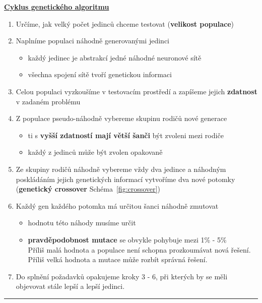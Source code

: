 \documentclass[a4paper,12pt]{article}
\begin{document}
        \underline{\textbf{\large{Cyklus genetického algoritmu}}}
        \begin{enumerate}[itemsep=-1.5mm]
            \item Určíme, jak velký počet jedinců chceme testovat (\textbf{velikost populace})
            \item Naplníme populaci náhodně generovanými jedinci
            \begin{itemize}[noitemsep]
                \item každý jedinec je abstrakcí jedné náhodné neuronové sítě
                \item všechna spojení sítě tvoří genetickou informaci
            \end{itemize}
            \item Celou populaci vyzkoušíme v testovacím prostředí a zapíšeme jejich \textbf{zdatnost} 
                v zadaném problému
            \item Z populace pseudo-náhodně vybereme skupinu rodičů nové generace 
            \begin{itemize}[noitemsep]
                \item ti s \textbf{vyšší zdatností mají větší šanči} být zvoleni mezi rodiče
                \item každý z jedinců může být zvolen opakovaně
            \end{itemize}
            \item Ze skupiny rodičů náhodně vybereme vždy dva jedince a náhodným poskládáním jejich
                genetických informací vytvoříme dva nové potomky (\textbf{genetický crossover} Schéma~\ref{fig:crossover})
            \item Každý gen každého potomka má určitou šanci náhodně zmutovat
            \begin{itemize}[noitemsep]
                \item hodnotu této náhody musíme určit
                \item \textbf{pravděpodobnost mutace} se obvykle pohybuje mezi 1\% - 5\%\\
                    Příliš malá hodnota a populace není schopna prozkoumávat nová řešení.
                    Příliš velká hodnota a mutace může rozbít správná řešení.

            \end{itemize}
            \item Do splnění požadavků opakujeme kroky 3 - 6, při kterých by se měli 
                objevovat stále lepší a lepší jedinci.
        \end{enumerate}
        \hrule
\end{document}
